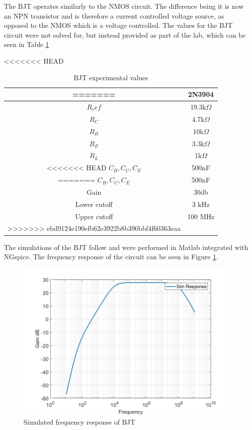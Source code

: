 
The BJT operates similarly to the NMOS circuit. The difference being it is now an NPN transistor and is therefore a current controlled voltage source, as opposed to the NMOS which is a voltage controlled. The values for the BJT circuit were not solved for, but instead provided as part of the lab, which can be seen in Table \ref{tab:bjttab}

\begin{table}[H]
	\centering
	\caption{BJT experimental values}
	\label{tab:bjttab}
<<<<<<< HEAD
	\begin{tabular}{|c|c|} \hline
=======
	\begin{tabular}{cc}
>>>>>>> ebd9124e190efb62c3922b8b390bbf4f60363eaa
		$Q_1, Q_2, Q_3$ & 2N3904        \\ \hline
		$R_ref$         & 19.3k$\Omega$ \\ \hline
		$R_C$           & 4.7k$\Omega$  \\ \hline
		$R_B$           & 10k$\Omega$   \\ \hline
		$R_E$           & 3.3k$\Omega$  \\ \hline
		$R_L$           & 1k$\Omega$    \\ \hline
<<<<<<< HEAD
		$C_B, C_C, C_E$ & 500nF      \\   \hline
=======
		$C_B, C_C, C_E$ & 500nF         \\  \hline
		Gain            & 30db          \\  \hline
		Lower cutoff    & 3 kHz         \\  \hline
		Upper cutoff    & 100 MHz       \\  \hline  
>>>>>>> ebd9124e190efb62c3922b8b390bbf4f60363eaa
	\end{tabular}
\end{table}

 The simulations of the BJT follow and were performed in Matlab integrated with NGspice. The frequency response of the circuit can be seen in Figure \ref{fig:bjtsimfreq}. 

\begin{figure}[H]
	\centering
	\includegraphics[width=.55\textwidth]{CircuitDevelopment/BJT_bandwidth.jpg}
	\caption{Simulated frequency response of BJT}
	\label{fig:bjtsimfreq}
\end{figure}

